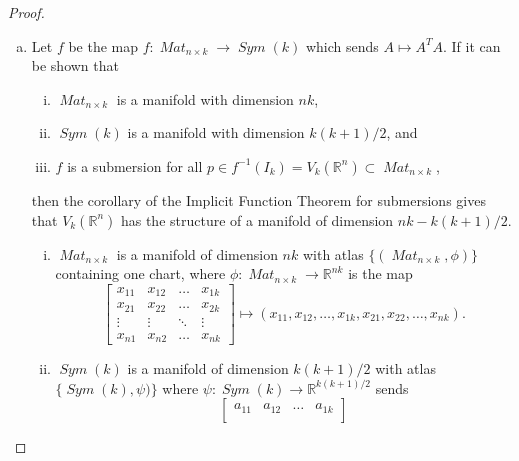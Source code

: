 \documentclass{article}
\begin{document}
\begin{proof} \text{} \\
  \begin{enumerate}[(a)]
    \item Let $f$ be the map
      $f\colon \operatorname{\mathit{Mat}}_{n\times k} \rightarrow \operatorname{\mathit{Sym}}(k)$
      which sends $A \mapsto A^TA$.
      If it can be shown that \begin{enumerate}[(i)]
        \item $\operatorname{\mathit{Mat}}_{n\times k}$ is a manifold with
          dimension $nk$,
        \item $\operatorname{\mathit{Sym}}(k)$ is a manifold with dimension
          $k(k+1)/2$, and
        \item $f$ is a submersion for all
          $p \in f^{-1}(I_k) = V_k(\mathbb{R}^n) \subset \operatorname{\mathit{Mat}}_{n\times k}$,
      \end{enumerate}
      then the corollary of the Implicit Function Theorem for submersions gives
      that $V_k(\mathbb{R}^n)$ has the structure of a manifold of dimension
      $nk - k(k+1)/2$.
      \begin{enumerate}[(i)]
        \item $\operatorname{\mathit{Mat}}_{n \times k}$
        is a manifold of dimension $nk$ with atlas
        $\{(\operatorname{\mathit{Mat}}_{n \times k}, \phi)\}$ containing one
        chart, where $
          \phi: \operatorname{\mathit{Mat}}_{n \times k}
            \rightarrow \mathbb{R}^{nk}
        $ is the map \[
          \begin{bmatrix}
            x_{11} & x_{12} & \dots  & x_{1k} \\
            x_{21} & x_{22} & \dots  & x_{2k} \\
            \vdots & \vdots & \ddots & \vdots \\
            x_{n1} & x_{n2} & \dots  & x_{nk}
          \end{bmatrix}
          \mapsto (x_{11}, x_{12}, \hdots, x_{1k}, x_{21}, x_{22},\hdots, x_{nk}).
        \]
        \item $\operatorname{\mathit{Sym}}(k)$ is a manifold of dimension
          $k(k+1)/2$ with atlas $\{\operatorname{\mathit{Sym}}(k), \psi)\}$
          where
          $\psi\colon \operatorname{\mathit{Sym}}(k) \rightarrow \mathbb{R}^{k(k + 1)/2}$
          sends \[
            \begin{bmatrix}
              a_{11} & a_{12} & \dots  & a_{1k} \\

\end{bmatrix}\]
\end{enumerate}
\end{enumerate}
\end{proof}
\end{document}
